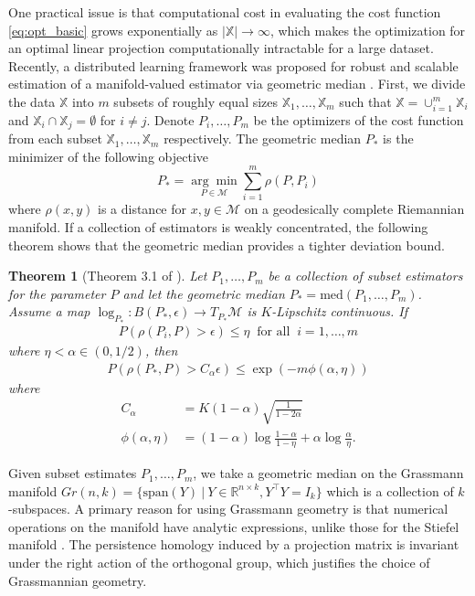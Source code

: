 \documentclass[11pt]{article}
\newtheorem{theorem}{Theorem}[section]
\begin{document}
One practical issue is that computational cost in evaluating the cost function \eqref{eq:opt_basic} grows exponentially as $\vert \mathbb{X} \vert \rightarrow \infty$, which makes the optimization for an optimal linear projection computationally intractable for a large dataset. Recently, a distributed learning framework was proposed for robust and scalable estimation of a manifold-valued estimator via geometric median  \citep{lin_robust_2020}. First, we divide the data $\mathbb{X}$ into $m$ subsets of roughly equal sizes $\mathbb{X}_1, \ldots, \mathbb{X}_m$ such that $\mathbb{X} = \cup_{i=1}^m \mathbb{X}_i$ and $\mathbb{X}_i \cap \mathbb{X}_j = \emptyset$ for $i\neq j$. Denote $P_i, \ldots, P_m$ be the optimizers of the cost function from each subset $\mathbb{X}_1,\ldots, \mathbb{X}_m$ respectively. The geometric median $P_*$ is the minimizer of the following objective
\begin{equation}\label{eq:opt_median}
P_* = \underset{P \in \mathcal{M}}{\arg\min} \sum_{i=1}^m \rho (P, P_i)
\end{equation}
where $\rho(x, y)$ is a distance for $x,y\in\mathcal{M}$ on a geodesically complete Riemannian manifold. If a collection of estimators is weakly concentrated, the following theorem shows that the geometric median provides a tighter deviation bound.

\begin{theorem}[Theorem 3.1 of \cite{lin_robust_2020}]\label{thm:robust}
	Let $P_1, \ldots, P_m$ be a collection of subset estimators for the parameter $P$ and let the geometric median $P_* = \textrm{med}(P_1,\ldots,P_m)$. Assume a map $\log_{P_*} : B(P_*, \epsilon) \rightarrow T_{P_*}\mathcal{M}$ is $K$-Lipschitz continuous.  If
	\begin{gather}
	P(\rho(P_i, P) > \epsilon) \leq \eta ~\textrm{  for all  }~ i=1,\ldots,m
	\end{gather}
	where $\eta < \alpha \in (0, 1/2)$, then 
	\begin{gather}
	P\left(\rho(P_*, P) > C_\alpha \epsilon \right) \leq \exp (-m \phi (\alpha, \eta))
	\end{gather}
	where 
	\begin{align*}
	C_\alpha &= K (1-\alpha) \sqrt{\frac{1}{1-2\alpha}}\\
	\phi(\alpha,\eta) &= (1-\alpha)\log \frac{1-\alpha}{1-\eta} + \alpha \log \frac{\alpha}{\eta}.
	\end{align*}
\end{theorem}


Given subset estimates $P_1, \ldots, P_m$, we take a geometric median on the Grassmann manifold $Gr(n,k) = \lbrace \text{span}(Y)~|~Y \in \mathbb{R}^{n\times k}, Y^\top Y = I_k \rbrace$ which is a collection of $k$-subspaces. A primary reason for using Grassmann geometry is that numerical operations on the manifold have analytic expressions, unlike those for the Stiefel manifold \citep{edelman_geometry_1998}. The persistence homology induced by a projection matrix is invariant under the right action of the orthogonal group, which justifies the choice of Grassmannian geometry. 
\end{document}
